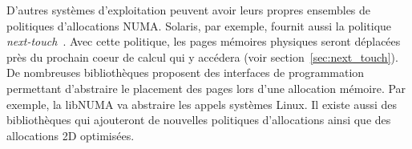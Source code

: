 D'autres systèmes d'exploitation peuvent avoir leurs propres ensembles de politiques d'allocations NUMA.
%
Solaris, par exemple, fournit aussi la politique {\em next-touch}~\cite{next_touch}.
%
Avec cette politique, les pages mémoires physiques seront déplacées près du prochain coeur de calcul qui y accédera (voir section~\ref{sec:next_touch}).
%
De nombreuses bibliothèques proposent des interfaces de programmation permettant d'abstraire le placement des pages lors d'une allocation mémoire.
%
Par exemple, la libNUMA\cite{libnuma} va abstraire les appels systèmes Linux.
%
Il existe aussi des bibliothèques qui ajouteront de nouvelles politiques d'allocations ainsi que des allocations 2D optimisées\cite{minas}.
